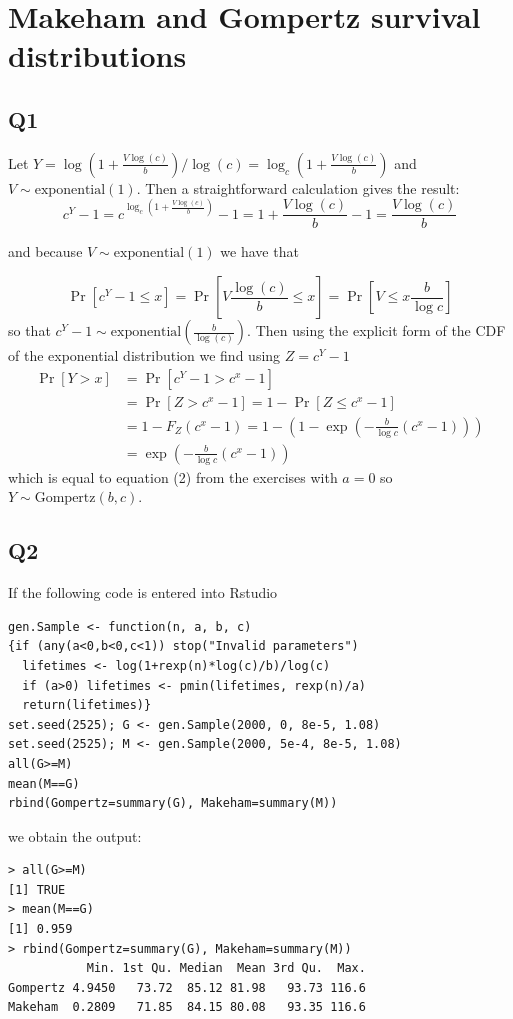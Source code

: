 
\section*{Makeham and Gompertz survival distributions}

\subsection*{Q1}

Let $Y = \log(1+\frac{V \log(c)}{b}) / \log(c) = \log_c(1+\frac{V \log(c)}{b})$ and $V \sim \text{exponential}(1)$. Then a straightforward calculation gives the result:
\begin{equation}
c^Y - 1 = c^{ \log_c(1+\frac{V \log(c)}{b})} - 1 = 1+\frac{V\log(c)}{b} - 1 = \frac{V \log(c)}{b}
\end{equation}

and because $V \sim \text{exponential}(1)$ we have that

\begin{equation}
\Pr[c^Y - 1 \le x ] = \Pr[V \frac{\log(c)}{b} \le x ] = \Pr[V \le x \frac{b}{\log{c}}] 
\end{equation}
so that $c^Y - 1 \sim \text{exponential}( \frac{b}{\log(c)})$. Then using the explicit form of the CDF of the exponential distribution we find using $Z = c^Y - 1 $
\begin{equation}
\begin{split}
\Pr[Y > x] & = \Pr[c^Y - 1 > c^x - 1] \\ 
		 & = \Pr[Z > c^x - 1] = 1- \Pr[Z \le c^x - 1]  \\
		 & = 1 - F_Z(c^x - 1) = 1 - (1-\exp(-\frac{b}{\log c} (c^x - 1))) \\
	     & = \exp(-\frac{b}{\log c} (c^x - 1))
\end{split}
\end{equation}
which is equal to equation (2) from the exercises with $a = 0$ so $ Y \sim \text{Gompertz}(b,c)$.

\subsection*{Q2}
If the following code is entered into Rstudio
\begin{verbatim}
gen.Sample <- function(n, a, b, c)
{if (any(a<0,b<0,c<1)) stop("Invalid parameters")
  lifetimes <- log(1+rexp(n)*log(c)/b)/log(c)
  if (a>0) lifetimes <- pmin(lifetimes, rexp(n)/a)
  return(lifetimes)}
set.seed(2525); G <- gen.Sample(2000, 0, 8e-5, 1.08)
set.seed(2525); M <- gen.Sample(2000, 5e-4, 8e-5, 1.08)
all(G>=M) 
mean(M==G) 
rbind(Gompertz=summary(G), Makeham=summary(M))
\end{verbatim}
we obtain the output:
\begin{verbatim}
> all(G>=M) 
[1] TRUE
> mean(M==G) 
[1] 0.959
> rbind(Gompertz=summary(G), Makeham=summary(M))
           Min. 1st Qu. Median  Mean 3rd Qu.  Max.
Gompertz 4.9450   73.72  85.12 81.98   93.73 116.6
Makeham  0.2809   71.85  84.15 80.08   93.35 116.6
\end{verbatim}

